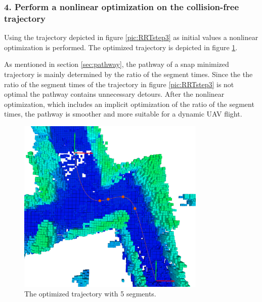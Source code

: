 


\subsubsection{4. Perform a nonlinear optimization on the collision-free trajectory}

Using the trajectory depicted in figure \ref{pic:RRTstep3} as initial values a nonlinear optimization is performed. The optimized trajectory is depicted in figure \ref{pic:RRTstep4}. \newline


As mentioned in section \ref{sec:pathway}, the pathway of a snap minimized trajectory is mainly determined by the ratio of the segment times. Since the the ratio of the segment times of the trajectory in figure \ref{pic:RRTstep3} is not optimal the pathway contains unnecessary detours. \newline
After the nonlinear optimization, which includes an implicit optimization of the ratio of the segment times, the pathway is smoother and more suitable for a dynamic UAV flight.


\begin{figure}[h]
   \centering
   \includegraphics[trim = 60mm 0mm 35mm 0mm, clip,width=0.8\textwidth]{pics/extensionCLongP.png}
   \caption{The optimized trajectory with 5 segments.}
\label{pic:RRTstep4}
\end{figure}

